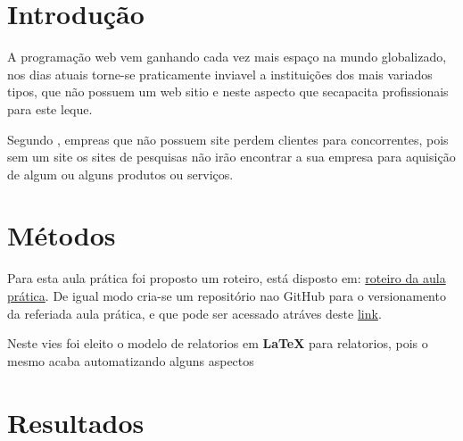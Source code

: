 
\section{Introdução}

\par A programação web vem ganhando cada vez mais espaço na mundo globalizado, nos dias atuais torne-se praticamente inviavel a instituições dos mais variados tipos, que não possuem um web sitio e neste aspecto que secapacita profissionais para este leque.
\par Segundo , empreas que não possuem site perdem clientes para concorrentes, pois sem um site os sites de pesquisas não irão encontrar a sua empresa para aquisição de algum ou alguns produtos ou serviços.




\section{Métodos}
\par Para esta aula prática foi proposto um roteiro, está disposto em: \href {https://github.com/ENGENHARIA-DE-SOFTWARE-UNOPAR/web-project/blob/main/Roteiro%20aula%20pr%C3%A1tica.pdf} {roteiro da aula prática}. De igual modo cria-se um repositório nao GitHub para o versionamento da referiada aula prática, e que pode ser acessado atráves deste \href {https://github.com/ENGENHARIA-DE-SOFTWARE-UNOPAR/web-project} {link}.
\par Neste vies foi eleito o modelo de relatorios em \textbf{LaTeX} para relatorios, pois o mesmo acaba automatizando alguns aspectos

\section{Resultados}








